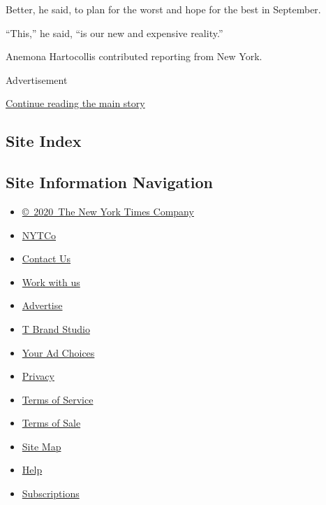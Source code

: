 Better, he said, to plan for the worst and hope for the best in
September.

``This,'' he said, ``is our new and expensive reality.''

Anemona Hartocollis contributed reporting from New York.

Advertisement

\protect\hyperlink{after-bottom}{Continue reading the main story}

\hypertarget{site-index}{%
\subsection{Site Index}\label{site-index}}

\hypertarget{site-information-navigation}{%
\subsection{Site Information
Navigation}\label{site-information-navigation}}

\begin{itemize}
\tightlist
\item
  \href{https://help.nytimes.com/hc/en-us/articles/115014792127-Copyright-notice}{©~2020~The
  New York Times Company}
\end{itemize}

\begin{itemize}
\tightlist
\item
  \href{https://www.nytco.com/}{NYTCo}
\item
  \href{https://help.nytimes.com/hc/en-us/articles/115015385887-Contact-Us}{Contact
  Us}
\item
  \href{https://www.nytco.com/careers/}{Work with us}
\item
  \href{https://nytmediakit.com/}{Advertise}
\item
  \href{http://www.tbrandstudio.com/}{T Brand Studio}
\item
  \href{https://www.nytimes.com/privacy/cookie-policy\#how-do-i-manage-trackers}{Your
  Ad Choices}
\item
  \href{https://www.nytimes.com/privacy}{Privacy}
\item
  \href{https://help.nytimes.com/hc/en-us/articles/115014893428-Terms-of-service}{Terms
  of Service}
\item
  \href{https://help.nytimes.com/hc/en-us/articles/115014893968-Terms-of-sale}{Terms
  of Sale}
\item
  \href{https://spiderbites.nytimes.com}{Site Map}
\item
  \href{https://help.nytimes.com/hc/en-us}{Help}
\item
  \href{https://www.nytimes.com/subscription?campaignId=37WXW}{Subscriptions}
\end{itemize}
